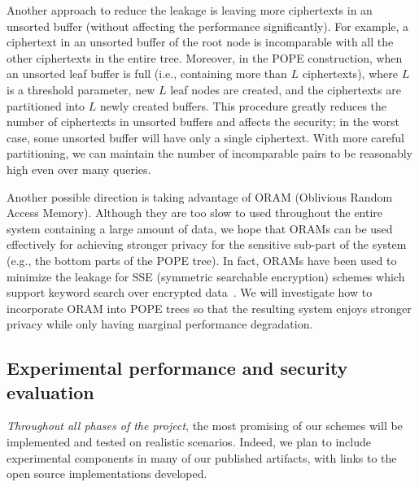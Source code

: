 

Another approach to reduce the leakage is leaving more ciphertexts in an
unsorted buffer (without affecting the performance significantly). For example,
a ciphertext in an unsorted buffer of the root node is incomparable with all
the other ciphertexts in the entire tree.  Moreover, in the POPE construction,
when an unsorted leaf buffer is full (i.e.,  containing more than $L$
ciphertexts), where $L$ is a threshold parameter, new $L$ leaf nodes are
created, and the ciphertexts are partitioned into $L$ newly created buffers.
This procedure greatly reduces the number of ciphertexts in unsorted buffers
and affects the security; in the worst case, some unsorted buffer will have
only a single ciphertext. With more careful partitioning, we can maintain the
number of incomparable pairs to be reasonably high even over many queries. 


Another possible direction is taking advantage of ORAM (Oblivious Random Access
Memory). Although they are too slow to used throughout the entire system
containing a large amount of data, we hope that ORAMs can be used effectively
for achieving stronger privacy for the sensitive sub-part of the system (e.g.,
the bottom parts of the POPE tree).  In fact, ORAMs have been used to minimize
the leakage for SSE (symmetric searchable encryption) schemes which support
keyword search over encrypted
data~\cite{NDSS:StePapShi14,C:GarMohPap16,RSA:IKLO16}. We will investigate how
to incorporate ORAM into POPE trees so that the resulting system enjoys
stronger privacy while only having marginal performance degradation.  




\subsection{Experimental performance and security evaluation}

\emph{Throughout all phases of the project}, the most promising of our
schemes will be implemented and tested on realistic scenarios.
Indeed, we plan to include
experimental components in many of our published artifacts, with
links to the open source implementations developed.

